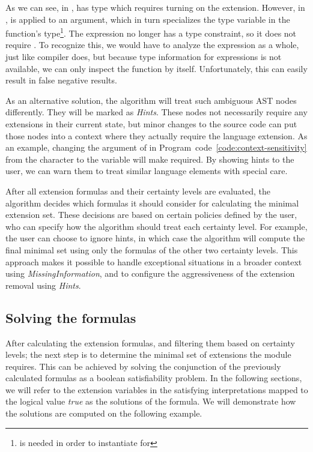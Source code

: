 \documentclass[main.tex]{subfiles}
\begin{document}
	\noindent
	As we can see, in ,  has type which requires turning on the extension. However, in ,  is applied to an argument, which in turn specializes the type variable in the function's type\footnote{ is needed in order to instantiate  for \ilcode{[Char]}}. The expression  no longer has a type constraint, so it does not require . To recognize this, we would have to analyze the expression as a whole, just like compiler does, but because type information for expressions is not available, we can only inspect the function by itself. Unfortunately, this can easily result in false negative results.
	
	As an alternative solution, the algorithm will treat such ambiguous AST nodes differently. They will be marked as \emph{Hints}. These nodes not necessarily require any extensions in their current state, but minor changes to the source code can put those nodes into a context where they actually require the language extension. As an example, changing the argument of  in Program~code~\ref{code:context-sensitivity} from the character  to the variable  will make  required. By showing hints to the user, we can warn them to treat similar language elements with special care.
	
	After all extension formulas and their certainty levels are evaluated, the algorithm decides which formulas it should consider for calculating the minimal extension set. These decisions are based on certain policies defined by the user, who can specify how the algorithm should treat each certainty level. For example, the user can choose to ignore hints, in which case the algorithm will compute the final minimal set using only the formulas of the other two certainty levels. This approach makes it possible to handle exceptional situations in a broader context using \emph{MissingInformation}, and to configure the aggressiveness of the extension removal using \emph{Hints}.
	
	\subsection{Solving the formulas} \label{sat-solver}
	
	After calculating the extension formulas, and filtering them based on certainty levels; the next step is to determine the minimal set of extensions the module requires. This can be achieved by solving the conjunction of the previously calculated formulas as a boolean satisfiability problem. In the following sections, we will refer to the extension variables in the satisfying interpretations mapped to the logical value \emph{true} as the solutions of the formula. We will demonstrate how the solutions are computed on the following example.
\end{document}
